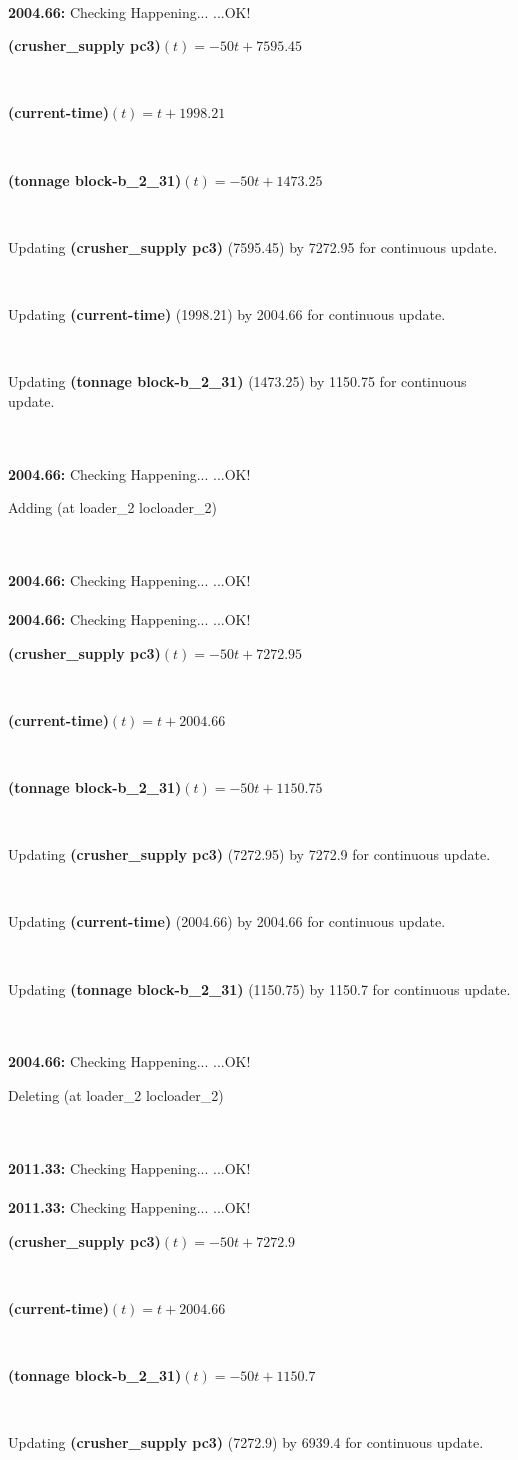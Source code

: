 \documentclass[a4paper,12pt]{article}
\newcommand{\atime}[1]{{\bf #1:}}
\newcommand{\exprn}[1]{{\sf #1}}
\newcommand{\fexprn}[1]{{\small {\bf #1}}}
\newcommand{\checkhappening}{Checking Happening... }
\newcommand{\listrow}[1]{\begin{minipage}[t]{11.5cm} #1 \end{minipage}}
\newcommand{\happeningOK}{...OK!}
\newcommand{\assignmentcts}[3]{\listrow{Updating \fexprn{#1} (#2) by #3 for continuous update.}}
\newcommand{\function}[2]{\listrow{\fexprn{#1}$(t) = #2$}}
\newcommand{\adding}[1]{\listrow{Adding \exprn{#1} }}
\newcommand{\deleting}[1]{\listrow{Deleting \exprn{#1} }}
\begin{document}
\begin{tabbing}
\\
\atime{2004.66} \> \checkhappening\happeningOK\\
 \> \function{(crusher\_supply pc3)}{ - 50t + 7595.45}\\
 \> \function{(current-time)}{t + 1998.21}\\
 \> \function{(tonnage block-b\_2\_31)}{ - 50t + 1473.25}\\
 \> \assignmentcts{(crusher\_supply pc3)}{7595.45}{7272.95}\\
 \> \assignmentcts{(current-time)}{1998.21}{2004.66}\\
 \> \assignmentcts{(tonnage block-b\_2\_31)}{1473.25}{1150.75}\\
\\
\atime{2004.66} \> \checkhappening\happeningOK\\
 \> \adding{(at loader\_2 locloader\_2)}\\
\\
\atime{2004.66} \> \checkhappening\happeningOK\\
\\
\atime{2004.66} \> \checkhappening\happeningOK\\
 \> \function{(crusher\_supply pc3)}{ - 50t + 7272.95}\\
 \> \function{(current-time)}{t + 2004.66}\\
 \> \function{(tonnage block-b\_2\_31)}{ - 50t + 1150.75}\\
 \> \assignmentcts{(crusher\_supply pc3)}{7272.95}{7272.9}\\
 \> \assignmentcts{(current-time)}{2004.66}{2004.66}\\
 \> \assignmentcts{(tonnage block-b\_2\_31)}{1150.75}{1150.7}\\
\\
\atime{2004.66} \> \checkhappening\happeningOK\\
 \> \deleting{(at loader\_2 locloader\_2)}\\
\\
\atime{2011.33} \> \checkhappening\happeningOK\\
\\
\atime{2011.33} \> \checkhappening\happeningOK\\
 \> \function{(crusher\_supply pc3)}{ - 50t + 7272.9}\\
 \> \function{(current-time)}{t + 2004.66}\\
 \> \function{(tonnage block-b\_2\_31)}{ - 50t + 1150.7}\\
 \> \assignmentcts{(crusher\_supply pc3)}{7272.9}{6939.4}\\

\end{tabbing}
\end{document}
